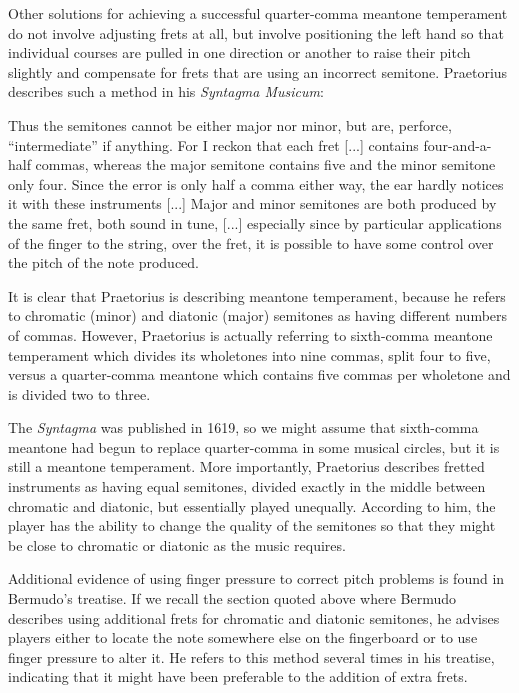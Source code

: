 Other solutions for achieving a successful quarter-comma
meantone
temperament do not involve adjusting frets at all, but involve positioning the left hand
so that individual courses are pulled in one direction or another to raise their pitch
slightly and compensate for frets that are using an incorrect semitone. Praetorius
describes such a method in his \textit{Syntagma Musicum}:
\begin{blocks}
Thus the semitones cannot be either major nor minor, but are, perforce, ``intermediate''
if anything. For I reckon that each fret [...] contains four-and-a-half commas, whereas
the major semitone contains five and the minor semitone only four. Since the error is
only half a comma either way, the ear hardly notices it with these instruments [...]
Major and minor semitones are both produced by the same fret, both sound in tune, [...]
especially since by particular applications of the finger to the string, over the fret,
it is possible to have some control over the pitch of the note produced.
\autocite[68]{MP:1}
\end{blocks}
It is clear that Praetorius is describing meantone temperament, because he
refers to chromatic (minor) and diatonic (major) semitones as having different numbers of
commas.  However, Praetorius is actually referring to sixth-comma meantone temperament
which divides its wholetones into nine commas, split four to five, versus a quarter-comma
meantone which contains five commas per wholetone and is divided two to three.

The \textit{Syntagma} was published in 1619, so we might assume that sixth-comma
meantone had begun to replace quarter-comma in some musical circles, but it is still a
meantone temperament.  More importantly, Praetorius describes fretted instruments as
having equal semitones, divided exactly in the middle between chromatic and diatonic,
but essentially played unequally.  According to him, the player has the ability to
change the quality of the semitones so that they might be close to chromatic or
diatonic as the music requires.

Additional evidence of using finger pressure to correct pitch problems is found in
Bermudo's treatise.  If we recall the section quoted above where Bermudo describes
using additional frets for chromatic and diatonic semitones, he advises
players either to locate the note somewhere else on the fingerboard or to use finger
pressure to alter it.  He refers to this method several times in his treatise,
indicating that it might have been preferable to the addition of extra
frets. \autocite[106]{DE:1}

